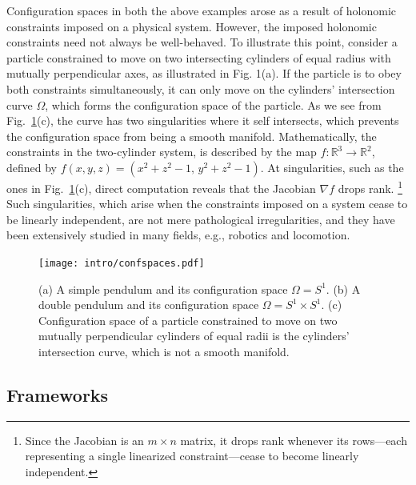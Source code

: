 Configuration spaces in both the above examples arose as a result of holonomic constraints imposed on a physical system.
However, the imposed holonomic constraints need not always be well-behaved.
To illustrate this point, consider a particle constrained to move on two intersecting cylinders of equal radius with mutually perpendicular axes, as illustrated in Fig. 1(a).
If the particle is to obey both constraints simultaneously, it can only move on the cylinders' intersection curve $\Omega$, which forms the configuration space of the particle.
As we see from Fig.~\ref{fig:confspaces}(c), the curve has two singularities where it self intersects, which prevents the configuration space from being a smooth manifold.
Mathematically, the constraints in the two-cylinder system, is described by the map $f: \mathbb{R}^{3} \to \mathbb{R}^{2}$, defined by $f(x, y, z) = (x^{2} + z^{2} - 1,\, y^{2} + z^{2} - 1)$.
At singularities, such as the ones in Fig.~\ref{fig:confspaces}(c), direct computation reveals that the Jacobian $\nabla f$ drops rank.%
\footnote{Since the Jacobian is an $m\times n$ matrix, it drops rank whenever its rows---each representing a single linearized constraint---cease to become linearly independent.}
Such singularities, which arise when the constraints imposed on a system cease to be linearly independent, are not mere pathological irregularities, and they have been extensively studied in many fields, e.g., robotics and locomotion.


\begin{figure}
  \begin{center}
    \texttt{[image: intro/confspaces.pdf]}
  \end{center}
  \caption{
  (a) A simple pendulum and its configuration space $\Omega = S^{1}$.
  (b) A double pendulum and its configuration space $\Omega = S^{1} \times S^{1}$.
  (c) Configuration space of a particle constrained to move on two mutually perpendicular cylinders of equal radii is the cylinders' intersection curve, which is not a smooth manifold.
  }
  \label{fig:confspaces}
\end{figure}

\subsection{Frameworks}

